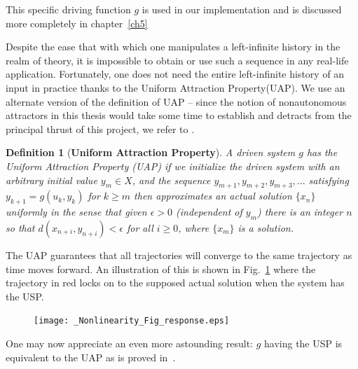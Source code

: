 \documentclass[a4paper,12pt,twoside]{report}
\newtheorem{Definition}{Definition}[]
\begin{document}
This specific driving function $g$ is used in our implementation and is discussed more completely in chapter~\ref{ch5}

Despite the ease that with which one manipulates a left-infinite history in the realm of theory, it is impossible to obtain or use such a sequence in any real-life application.  
Fortunately, one does not need the entire left-infinite history of an input in practice thanks to the Uniform Attraction Property(UAP). 
We use an alternate version of the definition of UAP -- since the notion of nonautonomous attractors in this thesis would take some time to establish and detracts from the principal thrust of this project, we refer to \cite{Manju_Nonlinearity}. 

\begin{Definition}
  [\bf Uniform Attraction Property]\label{Dfn_UAP}\rm
  A driven system $g$ has the Uniform Attraction Property (UAP) if we initialize the driven system
with an arbitrary initial value $y_m \in X$, and the sequence $y_{m+1}, y_{m+2}, y_{m+3},...$ satisfying $y_{k+1}= g(u_k,y_k)$ for $k \geq m$ then approximates an actual solution $\{x_n\}$ uniformly in the sense that given $\epsilon>0$ (independent of $y_m$) there is an integer $n$ so that $d(x_{n+i}, y_{n+i})<\epsilon$ for all $i\ge 0$, where $\{x_m\}$ is a solution.
\end{Definition}

The UAP guarantees that all trajectories will converge to the same trajectory as time moves forward. An illustration of this is shown in Fig.~\ref{fig:memloss_conttime} where the trajectory in red locks on to the supposed actual solution when the system has the USP.

\begin{figure}[ht]
  \texttt{[image: \_Nonlinearity\_Fig\_response.eps]}
  \centering
{}
\label{fig:memloss_conttime} 
\end{figure} 

One may now appreciate an even more astounding result: $g$ having the USP is equivalent to the UAP as is proved in~\cite{Manju_Nonlinearity}.
\end{document}
